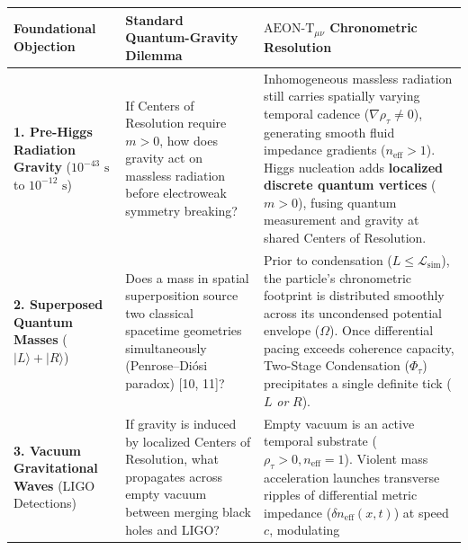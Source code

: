 \documentclass[
]{article}
\newcounter{none} %
\begin{document}
{\def\LTcaptype{none} %
\begin{longtable}[]{@{}
  >{\raggedright\arraybackslash}p{}
  >{\raggedright\arraybackslash}p{}
  >{\raggedright\arraybackslash}p{}@{}}
\toprule\noalign{}
\begin{minipage}[b]{\linewidth}\raggedright
Foundational Objection
\end{minipage} & \begin{minipage}[b]{\linewidth}\raggedright
Standard Quantum-Gravity Dilemma
\end{minipage} & \begin{minipage}[b]{\linewidth}\raggedright
\(\text{AEON-T}_{\mu\nu}\) Chronometric Resolution
\end{minipage} \\
\midrule\noalign{}
\endhead
\bottomrule\noalign{}
\endlastfoot
\textbf{1. Pre-Higgs Radiation Gravity} (\(10^{-43}\text{ s}\) to
\(10^{-12}\text{ s}\)) & If Centers of Resolution require \(m > 0\), how
does gravity act on massless radiation before electroweak symmetry
breaking? & Inhomogeneous massless radiation still carries spatially
varying temporal cadence (\(\nabla\rho_\tau \neq 0\)), generating smooth
fluid impedance gradients (\(n_{\mathrm{eff}} > 1\)). Higgs nucleation
adds \textbf{localized discrete quantum vertices} (\(m > 0\)), fusing
quantum measurement and gravity at shared Centers of Resolution. \\
\textbf{2. Superposed Quantum Masses} (\(|L\rangle + |R\rangle\)) & Does
a mass in spatial superposition source two classical spacetime
geometries simultaneously (Penrose--Diósi paradox) {[}10, 11{]}? & Prior
to condensation (\(L \le \mathcal{L}_{\mathrm{sim}}\)), the particle's
chronometric footprint is distributed smoothly across its uncondensed
potential envelope (\(\Omega\)). Once differential pacing exceeds
coherence capacity, Two-Stage Condensation (\(\Phi_\tau\)) precipitates
a single definite tick (\(L\) \emph{or} \(R\)). \\
\textbf{3. Vacuum Gravitational Waves} (LIGO Detections) & If gravity is
induced by localized Centers of Resolution, what propagates across empty
vacuum between merging black holes and LIGO? & Empty vacuum is an active
temporal substrate (\(\rho_\tau > 0, n_{\mathrm{eff}} = 1\)). Violent
mass acceleration launches transverse ripples of differential metric
impedance (\(\delta n_{\mathrm{eff}}(x, t)\)) at speed \(c\), modulating

\end{longtable}}
\end{document}
